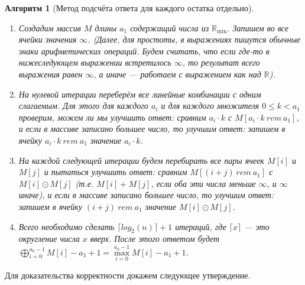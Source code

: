 \documentclass[12pt]{article}
\newtheorem{algorithm}[theorem]{Алгоритм}
\begin{document}
\begin{algorithm}[Метод подсчёта ответа для каждого остатка отдельно] { \ }
\label{algorithm2}
\begin{enumerate}
	\item Создадим массив $M$ длины $a_1$ содержащий числа из $\mathbb{R}_{\min}$. Запишем во все ячейки значения $\infty$. (Далее, для простоты, в выражениях пишутся обычные знаки арифметических операций. Будем считать, что если где-то в нижеследующем выражении встретилось $\infty$, то результат всего выражения равен $\infty$, а иначе --- работаем с выражением как над $\mathbb{R}$).
	
	\item На нулевой итерации переберём все линейные комбинации с одним слагаемым. Для этого для каждого $a_i$ и для каждого множителя $0 \le k < a_1$ проверим, можем ли мы улучшить ответ: сравним $a_i \cdot k$ с $M[a_i \cdot k \ rem \ a_1]$, и если в массиве записано большее число, то улучшим ответ: запишем в ячейку $a_i \cdot k \ rem \ a_1$ значение $a_i \cdot k$.
	
	\item На каждой следующей итерации будем перебирать все пары ячеек $M[i]$ и $M[j]$ и пытаться улучшить ответ: сравним $M[(i + j) \ rem \ a_1]$ с $M[i] \odot M[j]$ (т.е. $M[i] + M[j]$, если оба эти числа меньше $\infty$, и $\infty$ иначе), и если в массиве записано большее число, то улучшим ответ: запишем в ячейку $(i + j) \ rem \ a_1$ значение $M[i] \odot M[j]$.
	
	\item Всего необходимо сделать $\lceil log_2(n) \rceil + 1$ итераций, где $\lceil x \rceil$ --- это округление числа $x$ вверх. После 
этого ответом будет $\bigoplus \limits_{i = 0}^{a_0 - 1} M[i] - a_1 + 1 = \max\limits_{i = 0}^{a_0 - 1} M[i] - a_1 + 1$.
\end{enumerate}
\end{algorithm}

Для доказательства корректности докажем следующее утверждение.
\end{document}
